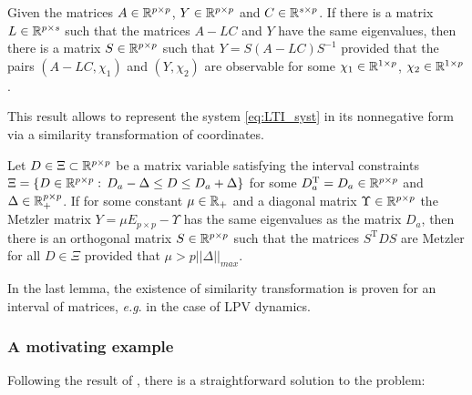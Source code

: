 \begin{lemma}
	\label{lem:l2}
	\begin{leftbar}[lemmabar]
		Given the matrices $A\in\mathbb{R}^{p\times p}$, $Y\in\mathbb{R}^{p\times p}$ and \textup{$C\in\mathbb{R}^{s\times p}$. }If there is a matrix \textup{$L\in\mathbb{R}^{p\times s}$} such that the matrices $A-LC$ and $Y$ have the same eigenvalues, then there is a matrix $S\in\mathbb{R}^{p\times p}$ such that $Y=S(A-LC)S^{-1}$ provided that the pairs $(A-LC,\chi_{1})$ and $(Y,\chi_{2})$ are observable for some $\chi_{1}\in\mathbb{R}^{1\times p}$, $\chi_{2}\in\mathbb{R}^{1\times p}$.
	\end{leftbar}
\end{lemma}
This result allows to represent the system \eqref{eq:LTI_syst} in its nonnegative form via a similarity transformation of coordinates.
\begin{lemma}
	\label{lem:l3}
	\begin{leftbar}[lemmabar]
		Let $D\in\Xi\subset\mathbb{R}^{p\times p}$ be a matrix variable satisfying the interval constraints $\Xi=\{D\in\mathbb{R}^{p\times p}:\,D_{a}-\Delta\le D\le D_{a}+\Delta\}$ for some $D_{a}^{\text{T}}=D_{a}\in\mathbb{R}^{p\times p}$ and $\Delta\in\mathbb{R}_{+}^{p\times p}$. If for some constant $\mu\in\mathbb{R}_{+}$ and a diagonal matrix $\Upsilon\in\mathbb{R}^{p\times p}$ the Metzler matrix $Y=\mu E_{p\times p}-\Upsilon$ has the same eigenvalues as the matrix $D_{a}$, then there is an orthogonal matrix $S\in\mathbb{R}^{p\times p}$ such that the matrices $S^{\text{T}}DS$ are Metzler for all $D\in\Xi$ provided that $\mu>p||\Delta||_{max}$.\textup{ }
	\end{leftbar}
\end{lemma}
In the last lemma, the existence of similarity transformation is proven for an interval of matrices, \emph{e.g}. in the case of \gls{LPV} dynamics.


\subsubsection{A motivating example}

Following the result of , there is a straightforward solution to the problem:


